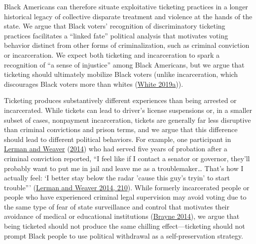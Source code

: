 \documentclass[
  12pt,
]{article}
\begin{document}
Black Americans can therefore situate exploitative ticketing practices in a longer historical legacy of collective disparate treatment and violence at the hands of the state. We argue that Black voters' recognition of discriminatory ticketing practices facilitates a ``linked fate'' political analysis that motivates voting behavior distinct from other forms of criminalization, such as criminal conviction or incarceration. We expect both ticketing and incarceration to spark a recognition of ``a sense of injustice'' among Black Americans, but we argue that ticketing should ultimately mobilize Black voters (unlike incarceration, which discourages Black voters more than whites (\protect\hyperlink{ref-White2019}{White 2019a})).

Ticketing produces substantively different experiences than being arrested or incarcerated. While tickets can lead to driver's license suspensions or, in a smaller subset of cases, nonpayment incarceration, tickets are generally far less disruptive than criminal convictions and prison terms, and we argue that this difference should lead to different political behaviors. For example, one participant in \protect\hyperlink{ref-Lerman2014}{Lerman and Weaver} (\protect\hyperlink{ref-Lerman2014}{2014}) who had served five years of probation after a criminal conviction reported, ``I feel like if I contact a senator or governor, they'll probably want to put me in jail and leave me as a troublemaker\ldots{} That's how I actually feel: `I better stay below the radar 'cause this guy's tryin' to start trouble''' (\protect\hyperlink{ref-Lerman2014}{Lerman and Weaver 2014, 210}). While formerly incarcerated people or people who have experienced criminal legal supervision may avoid voting due to the same type of fear of state surveillance and control that motivates their avoidance of medical or educational institutions (\protect\hyperlink{ref-Brayne2014}{Brayne 2014}), we argue that being ticketed should not produce the same chilling effect---ticketing should not prompt Black people to use political withdrawal as a self-preservation strategy.
\end{document}
